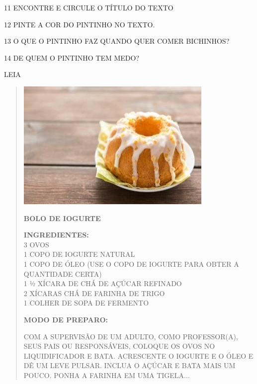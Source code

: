 \num{11} ENCONTRE E CIRCULE O TÍTULO DO TEXTO

\num{12} PINTE A COR DO PINTINHO NO TEXTO.

\num{13} O QUE O PINTINHO FAZ QUANDO QUER COMER BICHINHOS?


\num{14} DE QUEM O PINTINHO TEM MEDO?


\pagebreak
LEIA


\begin{quote}
\includegraphics[width=.7\textwidth]{media/image130.jpg}

\textbf{BOLO DE IOGURTE}

\begin{flushleft}
\textbf{INGREDIENTES:}\\
3 OVOS\\
1 COPO DE IOGURTE NATURAL\\
1 COPO DE ÓLEO (USE O COPO DE IOGURTE PARA OBTER A QUANTIDADE CERTA)\\
1 ½ XÍCARA DE CHÁ DE AÇÚCAR REFINADO\\
2 XÍCARAS CHÁ DE FARINHA DE TRIGO\\
1 COLHER DE SOPA DE FERMENTO

\textbf{MODO DE PREPARO:}

COM A SUPERVISÃO DE UM ADULTO, COMO PROFESSOR(A), SEUS PAIS OU RESPONSÁVEIS, COLOQUE OS OVOS NO LIQUIDIFICADOR E BATA. ACRESCENTE O IOGURTE E O ÓLEO
E DÊ UM LEVE PULSAR. INCLUA O AÇÚCAR E BATA MAIS UM POUCO. PONHA A
FARINHA EM UMA TIGELA...
\end{flushleft}

\end{quote}


